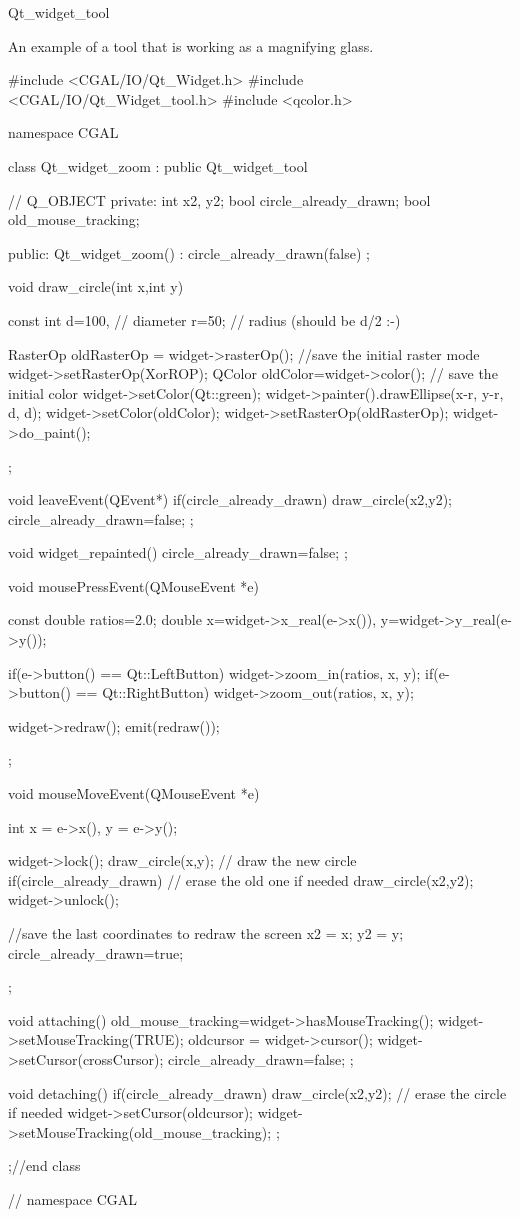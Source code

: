 \begin{ccRefClass}{Qt_widget_tool}
\ccExample

An example of a tool that is working as a magnifying glass.

\begin{ccExampleCode}
#include <CGAL/IO/Qt_Widget.h>
#include <CGAL/IO/Qt_Widget_tool.h>
#include <qcolor.h>

namespace CGAL {

class Qt_widget_zoom : public Qt_widget_tool
{
  //  Q_OBJECT
private:
	int  x2, y2;
	bool circle_already_drawn;
	bool old_mouse_tracking;

public:
  Qt_widget_zoom() : circle_already_drawn(false) {};

  void draw_circle(int x,int y)
  {
    const int
    d=100, // diameter
    r=50;  // radius (should be d/2 :-)

    RasterOp oldRasterOp = widget->rasterOp();	//save the initial raster mode
    widget->setRasterOp(XorROP);
    QColor oldColor=widget->color(); // save the initial color
    widget->setColor(Qt::green);
    widget->painter().drawEllipse(x-r, y-r, d, d);
    widget->setColor(oldColor);
    widget->setRasterOp(oldRasterOp);
    widget->do_paint();
  };

  void leaveEvent(QEvent*)
  {
    if(circle_already_drawn)
      draw_circle(x2,y2);
    circle_already_drawn=false;
  };

  void widget_repainted(){
    circle_already_drawn=false;
  };

  void mousePressEvent(QMouseEvent *e)
  {
    const double ratios=2.0;
    double
      x=widget->x_real(e->x()),
      y=widget->y_real(e->y());
		
    if(e->button() == Qt::LeftButton)
      widget->zoom_in(ratios, x, y);
    if(e->button() == Qt::RightButton)
      widget->zoom_out(ratios, x, y);
		
    widget->redraw();
    emit(redraw()); 
  };

  void mouseMoveEvent(QMouseEvent *e)
  {
    int
      x = e->x(),
      y = e->y();

    widget->lock();
    draw_circle(x,y); // draw the new circle
    if(circle_already_drawn) // erase the old one if needed
        draw_circle(x2,y2);
    widget->unlock();
		
    //save the last coordinates to redraw the screen
    x2 = x;
    y2 = y;
    circle_already_drawn=true;
  };

  void attaching()
  {
    old_mouse_tracking=widget->hasMouseTracking();
    widget->setMouseTracking(TRUE);
    oldcursor = widget->cursor();
    widget->setCursor(crossCursor);
    circle_already_drawn=false;
  };

  void detaching()
  {
    if(circle_already_drawn)
      draw_circle(x2,y2); // erase the circle if needed
    widget->setCursor(oldcursor);
    widget->setMouseTracking(old_mouse_tracking);
  };
};//end class 

} // namespace CGAL
\end{ccExampleCode}

\end{ccRefClass}








